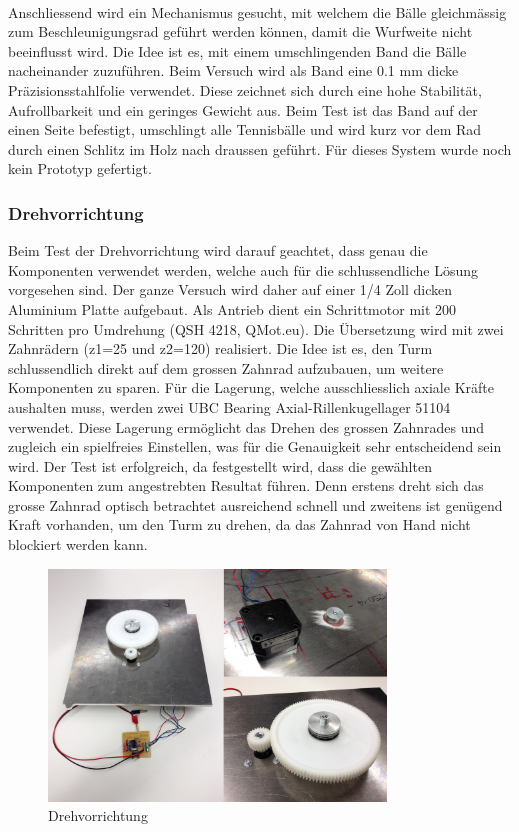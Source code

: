 \noindent
\\Anschliessend wird ein Mechanismus gesucht, mit welchem die Bälle 
gleichmässig zum Beschleunigungsrad geführt werden können, damit die Wurfweite 
nicht beeinflusst wird. Die Idee ist es, mit einem umschlingenden Band die 
Bälle nacheinander zuzuführen. Beim Versuch wird als Band eine 0.1 mm dicke 
Präzisionsstahlfolie verwendet. Diese zeichnet sich durch eine hohe Stabilität, 
Aufrollbarkeit und ein geringes Gewicht aus. Beim Test ist das Band auf der 
einen Seite befestigt, umschlingt alle Tennisbälle und wird kurz vor dem Rad 
durch einen Schlitz im Holz nach draussen geführt. Für dieses System wurde 
noch kein Prototyp gefertigt. \\


\subsubsection{Drehvorrichtung}
Beim Test der Drehvorrichtung wird darauf geachtet, dass genau die Komponenten 
verwendet werden, welche auch für die schlussendliche Lösung vorgesehen sind. 
Der ganze Versuch wird daher auf einer 1/4 Zoll dicken Aluminium Platte 
aufgebaut. Als Antrieb dient ein Schrittmotor mit 200 Schritten pro Umdrehung 
(QSH 4218, QMot.eu). Die Übersetzung wird mit zwei Zahnrädern (z1=25 und z2=120) 
realisiert. Die Idee ist es, den Turm schlussendlich direkt auf dem grossen 
Zahnrad aufzubauen, um weitere Komponenten zu sparen. Für die Lagerung, welche 
ausschliesslich axiale Kräfte aushalten muss, werden zwei UBC Bearing 
Axial-Rillenkugellager 51104 verwendet. Diese Lagerung ermöglicht das Drehen 
des grossen Zahnrades und zugleich ein spielfreies Einstellen, was für die 
Genauigkeit sehr entscheidend sein wird.
Der Test ist erfolgreich, da festgestellt wird, dass die gewählten Komponenten zum angestrebten Resultat führen. Denn erstens dreht sich das grosse Zahnrad optisch betrachtet ausreichend schnell und zweitens ist genügend Kraft vorhanden, um den Turm zu drehen, da das Zahnrad von Hand nicht blockiert werden kann.

\begin{figure}[h!]          
	\centering             
	\includegraphics[width=0.8\textwidth]{fig/Drehvorrichtung.png}    
	\caption{Drehvorrichtung}
	
	\label{fig:Drehvorrichtung}
\end{figure}
\noindent



